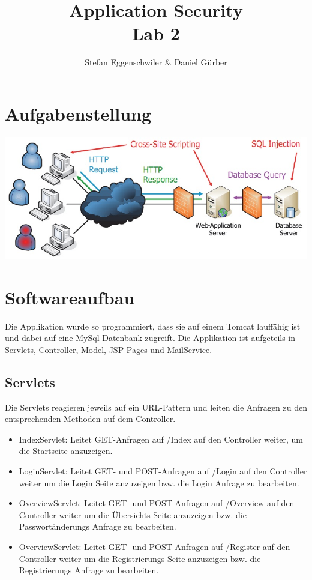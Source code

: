 \documentclass[12pt]{scrartcl}
\author{Stefan Eggenschwiler \& Daniel Gürber}
\title{ %
Application Security
\\Lab 2
\vspace{0.2cm}
}
\begin{document}
 \maketitle
 \thispagestyle{firststyle}
 \pagestyle{firststyle}
 \begin{abstract}
 \begin{center}
 \end{center}
 \vspace{0.5cm}
\hrulefill
\end{abstract}
\newpage

 \pagestyle{documentstyle}
 \tableofcontents
 \pagebreak
\section{Aufgabenstellung}
\includegraphics[scale=0.5]{./aufgabenstellung.jpg}

\section{Softwareaufbau}
Die Applikation wurde so programmiert, dass sie auf einem Tomcat lauffähig ist und dabei auf eine MySql Datenbank zugreift. Die Applikation ist aufgeteils in Servlets, Controller, Model, JSP-Pages und MailService.
\subsection{Servlets}
Die Servlets reagieren jeweils auf ein URL-Pattern und leiten die Anfragen zu den entsprechenden Methoden auf dem Controller.
\begin{itemize}
\item IndexServlet: Leitet GET-Anfragen auf /Index auf den Controller weiter, um die Startseite anzuzeigen.
\item LoginServlet: Leitet GET- und POST-Anfragen auf /Login auf den Controller weiter um die Login Seite anzuzeigen bzw. die Login Anfrage zu bearbeiten.
\item OverviewServlet: Leitet GET- und POST-Anfragen auf /Overview auf den Controller weiter um die Übersichts Seite anzuzeigen bzw. die Passwortänderungs Anfrage zu bearbeiten.
\item OverviewServlet: Leitet GET- und POST-Anfragen auf /Register auf den Controller weiter um die Registrierungs Seite anzuzeigen bzw. die Registrierungs Anfrage zu bearbeiten.
\end{itemize}
\newpage
\end{document}
